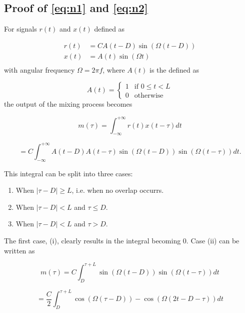 \begin{appendices}
\chapter{Proof of \ref{eq:n1} and \ref{eq:n2}}

For signals $r(t)$ and $x(t)$ defined as

\begin{equation}
	\begin{split}
		r(t) &= CA(t - D)\sin(\Omega(t - D)) \\
		x(t) &= A(t)\sin(\Omega t) \\
	\end{split}
\end{equation}
with angular frequency $\Omega = 2\pi f$, where $A(t)$ is the defined as 

\begin{equation}
	A(t) = \begin{cases}
		1 & \text{if $0 \leq t < L$} \\
		0 & \text{otherwise}
	\end{cases}
\end{equation}
the output of the mixing process becomes

\begin{equation}
	m(\tau) 
	= \int_{-\infty}^{+\infty}r(t)x(t-\tau)dt
\end{equation}

\begin{equation}	
	= C \int_{-\infty}^{+\infty}A(t-D)A(t-\tau)\sin(\Omega(t-D))\sin(\Omega(t-\tau))dt.
\end{equation}

This integral can be split into three cases:

\begin{enumerate}[label=(\roman*)]
	\item When $|\tau-D| \geq L$, i.e. when no overlap occurrs. 
	\item When $|\tau-D| < L$ and $\tau \leq D$.
	\item When $|\tau-D| < L$ and $\tau > D$.
\end{enumerate}

The first case, (i), clearly results in the integral becoming 0. Case (ii) can be written as

\begin{equation}
	m(\tau)
	= C\int_{D}^{\tau+L}\sin(\Omega(t-D))\sin(\Omega(t-\tau))dt
\end{equation}

\begin{equation}
	= \frac{C}{2}\int_D^{\tau+L} \cos(\Omega(\tau-D)) - \cos(\Omega(2t - D - \tau))dt
\end{equation}


\end{appendices}
